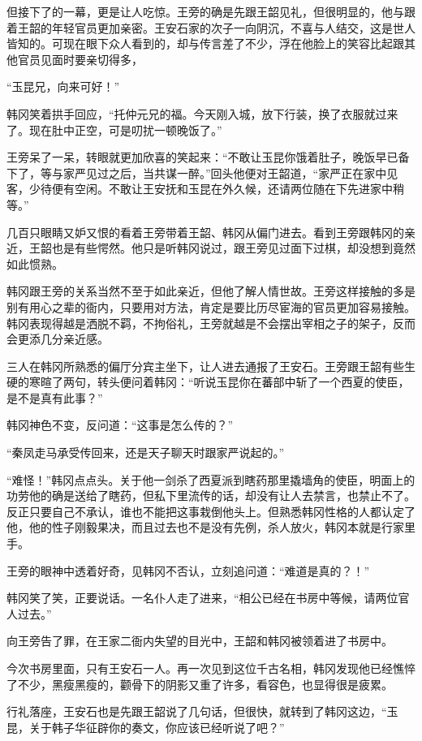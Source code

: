 但接下了的一幕，更是让人吃惊。王旁的确是先跟王韶见礼，但很明显的，他与跟着王韶的年轻官员更加亲密。王安石家的次子一向阴沉，不喜与人结交，这是世人皆知的。可现在眼下众人看到的，却与传言差了不少，浮在他脸上的笑容比起跟其他官员见面时要亲切得多，

“玉昆兄，向来可好！”

韩冈笑着拱手回应，“托仲元兄的福。今天刚入城，放下行装，换了衣服就过来了。现在肚中正空，可是叨扰一顿晚饭了。”

王旁呆了一呆，转眼就更加欣喜的笑起来：“不敢让玉昆你饿着肚子，晚饭早已备下了，等与家严见过之后，当共谋一醉。”回头他便对王韶道，“家严正在家中见客，少待便有空闲。不敢让王安抚和玉昆在外久候，还请两位随在下先进家中稍等。”

几百只眼睛又妒又恨的看着王旁带着王韶、韩冈从偏门进去。看到王旁跟韩冈的亲近，王韶也是有些愕然。他只是听韩冈说过，跟王旁见过面下过棋，却没想到竟然如此惯熟。

韩冈跟王旁的关系当然不至于如此亲近，但他了解人情世故。王旁这样接触的多是别有用心之辈的衙内，只要用对方法，肯定是要比历尽宦海的官员更加容易接触。韩冈表现得越是洒脱不羁，不拘俗礼，王旁就越是不会摆出宰相之子的架子，反而会更添几分亲近感。

三人在韩冈所熟悉的偏厅分宾主坐下，让人进去通报了王安石。王旁跟王韶有些生硬的寒暄了两句，转头便问着韩冈：“听说玉昆你在蕃部中斩了一个西夏的使臣，是不是真有此事？”

韩冈神色不变，反问道：“这事是怎么传的？”

“秦凤走马承受传回来，还是天子聊天时跟家严说起的。”

“难怪！”韩冈点点头。关于他一剑杀了西夏派到瞎药那里撬墙角的使臣，明面上的功劳他的确是送给了瞎药，但私下里流传的话，却没有让人去禁言，也禁止不了。反正只要自己不承认，谁也不能把这事栽倒他头上。但熟悉韩冈性格的人都认定了他，他的性子刚毅果决，而且过去也不是没有先例，杀人放火，韩冈本就是行家里手。

王旁的眼神中透着好奇，见韩冈不否认，立刻追问道：“难道是真的？！”

韩冈笑了笑，正要说话。一名仆人走了进来，“相公已经在书房中等候，请两位官人过去。”

向王旁告了罪，在王家二衙内失望的目光中，王韶和韩冈被领着进了书房中。

今次书房里面，只有王安石一人。再一次见到这位千古名相，韩冈发现他已经憔悴了不少，黑瘦黑瘦的，颧骨下的阴影又重了许多，看容色，也显得很是疲累。

行礼落座，王安石也是先跟王韶说了几句话，但很快，就转到了韩冈这边，“玉昆，关于韩子华征辟你的奏文，你应该已经听说了吧？”

